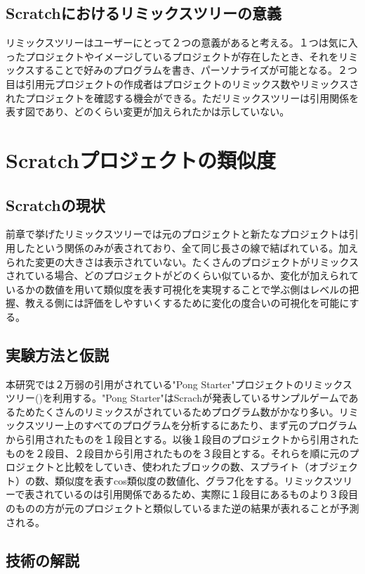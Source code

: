 \documentclass[a4paper,10pt,onecolumn,oneside,openany]{jsbook}
\begin{document}
\section{Scratchにおけるリミックスツリーの意義}
リミックスツリーはユーザーにとって２つの意義があると考える。１つは気に入ったプロジェクトやイメージしているプロジェクトが存在したとき、それをリミックスすることで好みのプログラムを書き、パーソナライズが可能となる。２つ目は引用元プロジェクトの作成者はプロジェクトのリミックス数やリミックスされたプロジェクトを確認する機会ができる。ただリミックスツリーは引用関係を表す図であり、どのくらい変更が加えられたかは示していない。



\chapter{Scratchプロジェクトの類似度}
\section{Scratchの現状}
前章で挙げたリミックスツリーでは元のプロジェクトと新たなプロジェクトは引用したという関係のみが表されており、全て同じ長さの線で結ばれている。加えられた変更の大きさは表示されていない。たくさんのプロジェクトがリミックスされている場合、どのプロジェクトがどのくらい似ているか、変化が加えられているかの数値を用いて類似度を表す可視化を実現することで学ぶ側はレベルの把握、教える側には評価をしやすいくするために変化の度合いの可視化を可能にする。
 \section{実験方法と仮説}
本研究では２万弱の引用がされている"Pong Starter"プロジェクトのリミックスツリー(\cite{pongret})を利用する。"Pong Starter"はScrachが発表しているサンプルゲームであるためたくさんのリミックスがされているためプログラム数がかなり多い。リミックスツリー上のすべてのプログラムを分析するにあたり、まず元のプログラムから引用されたものを１段目とする。以後１段目のプロジェクトから引用されたものを２段目、２段目から引用されたものを３段目とする。それらを順に元のプロジェクトと比較をしていき、使われたブロックの数、スプライト（オブジェクト）の数、類似度を表すcos類似度の数値化、グラフ化をする。リミックスツリーで表されているのは引用関係であるため、実際に１段目にあるものより３段目のものの方が元のプロジェクトと類似しているまた逆の結果が表れることが予測される。
\newpage
 \section{技術の解説}
\end{document}
